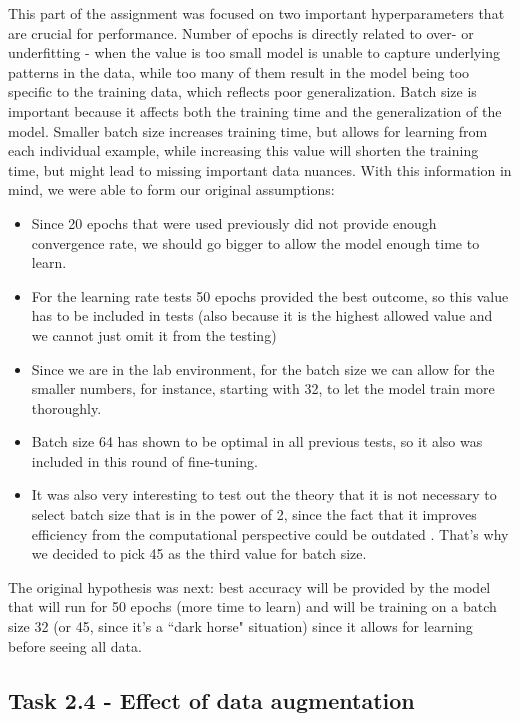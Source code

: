 \documentclass{article} %
\begin{document}
This part of the assignment was focused on two important hyperparameters that are crucial for performance. Number of epochs is directly related to over- or underfitting - when the value is too small model is unable to capture underlying patterns in the data, while too many of them result in the model being too specific to the training data, which reflects poor generalization. Batch size is important because it affects both the training time and the generalization of the model. Smaller batch size increases training time, but allows for learning from each individual example, while increasing this value will shorten the training time, but might lead to missing important data nuances. With this information in mind, we were able to form our original assumptions: 
\begin{itemize}
  \item Since 20 epochs that were used previously did not provide enough convergence rate, we should go bigger to allow the model enough time to learn.
  \item For the learning rate tests 50 epochs provided the best outcome, so this value has to be included in tests (also because it is the highest allowed value and we cannot just  omit it from the testing)
  \item Since we are in the lab environment, for the batch size we can allow for the smaller numbers, for instance, starting with 32, to let the model train more thoroughly.
  \item Batch size 64 has shown to be optimal in all previous tests, so it also was included in this round of fine-tuning.
  \item It was also very interesting to test out the theory that it is not necessary to select batch size that is in the power of 2, since the fact that it improves efficiency from the computational perspective could be outdated \cite{Raschka_2022}. That's why we decided to pick 45 as the third value for batch size.
\end{itemize}
The original hypothesis was next: best accuracy will be provided by the model that will run for 50 epochs (more time to learn) and will be training on a batch size 32 (or 45, since it's a ``dark horse" situation) since it allows for learning before seeing all data.

\subsection*{Task 2.4 - Effect of data augmentation}
\end{document}
